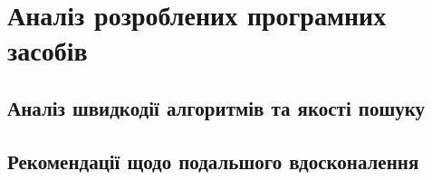 \newpage
\section{Аналіз розроблених програмних засобів}
\subsection{Аналіз швидкодії алгоритмів та якості пошуку}
\subsection{Рекомендації щодо подальшого вдосконалення}